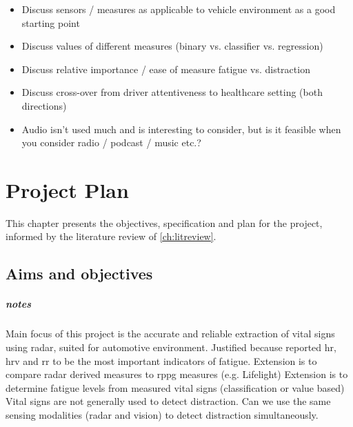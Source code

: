 \documentclass[11pt, parskip=half*,twoside=false]{scrbook}
\begin{document}
{\begin{itemize}
	\item Discuss sensors / measures as applicable to vehicle environment \citep{crayeMultiModalDriverFatigue2016} as a good starting point
	\item Discuss values of different measures (binary vs. classifier vs. regression)
	\item Discuss relative importance / ease of measure fatigue vs. distraction
	\item Discuss cross-over from driver attentiveness to healthcare setting (both directions)
	\item Audio isn't used much and is interesting to consider, but is it feasible when you consider radio / podcast / music etc.?
\end{itemize}



\chapter{Project Plan} \label{ch:plan}
This chapter presents the objectives, specification and plan for the project, informed by the literature review of \cref{ch:litreview}.

\section{Aims and objectives}


\paragraph{notes} Main focus of this project is the accurate and reliable extraction of vital signs using radar, suited for automotive environment.  Justified because \citet{zhouPredictingDriverFatigue2021} reported \gls{hr}, \gls{hrv} and \gls{rr} to be the most important indicators of fatigue. 
Extension is to compare radar derived measures to \gls{rppg} measures (e.g. Lifelight)
Extension is to determine fatigue levels from measured vital signs (classification or value based)
Vital signs are not generally used to detect distraction. Can we use the same sensing modalities (radar and vision) to detect distraction simultaneously.

}
\end{document}
